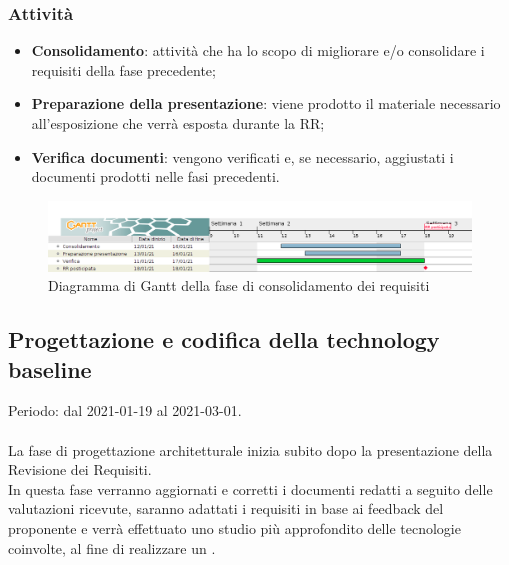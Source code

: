 \documentclass[../piano_di_progetto.tex]{subfiles}
\begin{document}
\subsubsection*{Attività}
\begin{itemize}
    \item \textbf{Consolidamento}: attività che ha lo scopo di migliorare e/o consolidare i requisiti della fase precedente;
    \item \textbf{Preparazione della presentazione}: viene prodotto il materiale necessario all'esposizione che verrà esposta durante la RR;
    \item \textbf{Verifica documenti}: vengono verificati e, se necessario, aggiustati i documenti prodotti nelle fasi precedenti. 
\end{itemize}



\begin{figure}[H]
\centering
\includegraphics[width=18cm]{src/img/gantt/4_2_consolidamento_dei_requisiti.png}
\caption{ Diagramma di Gantt della fase di consolidamento dei requisiti}
\end{figure}


\subsection{Progettazione e codifica della technology baseline}
\label{sub:tech_baseline}
Periodo: dal 2021-01-19 al 2021-03-01. \\ \\
La fase di progettazione architetturale inizia subito dopo la presentazione della Revisione dei Requisiti.\\
In questa fase verranno aggiornati e corretti i documenti redatti a seguito delle valutazioni ricevute, saranno adattati i requisiti in base ai feedback del proponente e verrà effettuato uno studio più approfondito delle tecnologie coinvolte, al fine di realizzare un .
\end{document}
